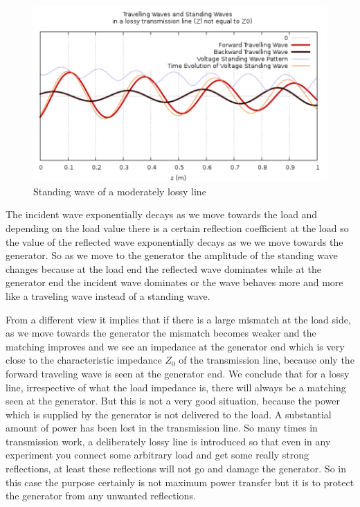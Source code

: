 \begin{figure}[h]
\centering
\includegraphics[width=1\linewidth]{./graphics/plot}
\caption{Standing wave of a moderately lossy line}
\end{figure}

The incident wave exponentially decays as we move towards the load and depending on the load value there is a certain reflection coefficient at the load so the value of the reflected wave exponentially decays as we we move towards the generator. So as we move to the generator the amplitude of the standing wave changes because at the load end the reflected wave dominates while at the generator end the incident wave dominates or the wave behaves more and more like a traveling wave instead of a standing wave.

From a different view it implies that if there is a large mismatch at the load side, as we move towards the generator the mismatch becomes weaker and the matching improves and we see an impedance at the generator end which is very close to the characteristic impedance $Z_0$ of the transmission line, because only the forward traveling wave is seen at the generator end. We conclude that for a lossy line, irrespective of what the load impedance is, there will always be a matching seen at the generator. But this is not a very good situation, because the power which is supplied by the generator is not delivered to the load. A substantial amount of power has been lost in the transmission line. So many times in transmission work, a deliberately lossy line is introduced so that even in any experiment you connect some arbitrary load and get  some really strong reflections, at least these reflections will not go and damage the generator. So in this case the purpose certainly is not maximum power transfer but it is to protect the generator from any unwanted reflections.

